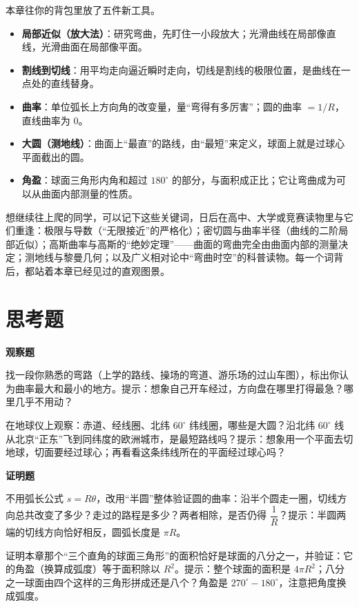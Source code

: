 \begin{toolbox}
本章往你的背包里放了五件新工具。
\begin{itemize}
  \item \textbf{局部近似（放大法）}：研究弯曲，先盯住一小段放大；光滑曲线在局部像直线，光滑曲面在局部像平面。
  \item \textbf{割线到切线}：用平均走向逼近瞬时走向，切线是割线的极限位置，是曲线在一点处的直线替身。
  \item \textbf{曲率}：单位弧长上方向角的改变量，量``弯得有多厉害''；圆的曲率 $= 1/R$，直线曲率为 $0$。
  \item \textbf{大圆（测地线）}：曲面上``最直''的路线，由``最短''来定义，球面上就是过球心平面截出的圆。
  \item \textbf{角盈}：球面三角形内角和超过 $180^\circ$ 的部分，与面积成正比；它让弯曲成为可以从曲面内部测量的性质。
\end{itemize}
\end{toolbox}

\begin{pandeng}
想继续往上爬的同学，可以记下这些关键词，日后在高中、大学或竞赛读物里与它们重逢：极限与导数（``无限接近''的严格化）；密切圆与曲率半径（曲线的二阶局部近似）；高斯曲率与高斯的``绝妙定理''——曲面的弯曲完全由曲面内部的测量决定；测地线与黎曼几何；以及广义相对论中``弯曲时空''的科普读物。每一个词背后，都站着本章已经见过的直观图景。
\end{pandeng}

\section*{思考题}

\textbf{观察题}

\begin{sikao}
  \item 找一段你熟悉的弯路（上学的路线、操场的弯道、游乐场的过山车图），标出你认为曲率最大和最小的地方。提示：想象自己开车经过，方向盘在哪里打得最急？哪里几乎不用动？
  \item 在地球仪上观察：赤道、经线圈、北纬 $60^\circ$ 纬线圈，哪些是大圆？沿北纬 $60^\circ$ 线从北京``正东''飞到同纬度的欧洲城市，是最短路线吗？提示：想象用一个平面去切地球，切面要经过球心；再看看这条纬线所在的平面经过球心吗？
\end{sikao}

\textbf{证明题}

\begin{sikao}
  \item 不用弧长公式 $s=R\theta$，改用``半圆''整体验证圆的曲率：沿半个圆走一圈，切线方向总共改变了多少？走过的路程是多少？两者相除，是否仍得 $\dfrac{1}{R}$？提示：半圆两端的切线方向恰好相反，圆弧长度是 $\pi R$。
  \item 证明本章那个``三个直角的球面三角形''的面积恰好是球面的八分之一，并验证：它的角盈（换算成弧度）等于面积除以 $R^2$。提示：整个球面的面积是 $4\pi R^2$；八分之一球面由四个这样的三角形拼成还是八个？角盈是 $270^\circ - 180^\circ$，注意把角度换成弧度。
\end{sikao}

